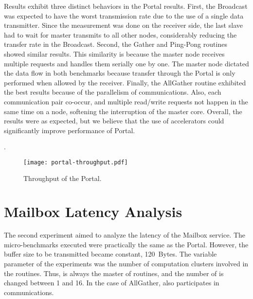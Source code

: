 		Results exhibit three distinct behaviors in the Portal results. First,
		the Broadcast was expected to have the worst transmission rate due to
		the use of a single data transmitter. Since the measurement was done
		on the receiver side, the last slave had to wait for master transmits
		to all other nodes, considerably reducing the transfer rate in the
		Broadcast. Second, the Gather and Ping-Pong routines showed similar
		results. This similarity is because the master node receives multiple
		requests and handles them serially one by one. The master node
		dictated the data flow in both benchmarks because transfer through
		the Portal is only performed when allowed by the receiver. Finally,
		the AllGather routine exhibited the best results because of the
		parallelism of communications. Also, each communication pair co-occur,
		and multiple read/write requests not happen in the same time on a node,
		softening the interruption of the master core. Overall, the results
		were as expected, but we believe that the use of \dma accelerators could
		significantly improve performance of Portal.


		.


		\begin{figure}[!tb]
			\centering%
			\caption{Throughput of the Portal.}%
			\label{fig:exp-portal}%
			\texttt{[image: portal-throughput.pdf]}%
		\end{figure}

	\section{Mailbox Latency Analysis}

		The second experiment aimed to analyze the latency of the Mailbox
		service. The micro-benchmarks executed were practically the same
		as the Portal. However, the buffer size to be transmitted became
		constant, 120~Bytes. The variable parameter of the experiments was
		the number of computation clusters involved in the routines.
		Thus, \iocluster is always the master of routines, and the number
		of \ccluster is changed between 1 and 16. In the case of AllGather,
		\iocluster also participates in communications.

